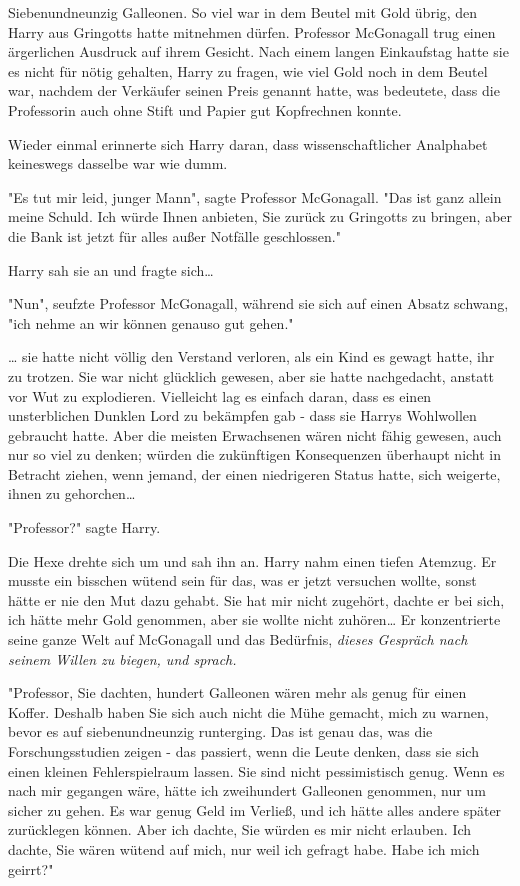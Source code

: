 {Siebenundneunzig Galleonen. So viel war in dem Beutel mit Gold übrig, den Harry aus Gringotts hatte mitnehmen dürfen. Professor McGonagall trug einen ärgerlichen Ausdruck auf ihrem Gesicht. Nach einem langen Einkaufstag hatte sie es nicht für nötig gehalten, Harry zu fragen, wie viel Gold noch in dem Beutel war, nachdem der Verkäufer seinen Preis genannt hatte, was bedeutete, dass die Professorin auch ohne Stift und Papier gut Kopfrechnen konnte.

Wieder einmal erinnerte sich Harry daran, dass wissenschaftlicher Analphabet keineswegs dasselbe war wie dumm.

"Es tut mir leid, junger Mann", sagte Professor McGonagall. "Das ist ganz allein meine Schuld. Ich würde Ihnen anbieten, Sie zurück zu Gringotts zu bringen, aber die Bank ist jetzt für alles außer Notfälle geschlossen."

Harry sah sie an und fragte sich…

"Nun", seufzte Professor McGonagall, während sie sich auf einen Absatz schwang, "ich nehme an wir können genauso gut gehen."

… sie hatte nicht völlig den Verstand verloren, als ein Kind es gewagt hatte, ihr zu trotzen. Sie war nicht glücklich gewesen, aber sie hatte nachgedacht, anstatt vor Wut zu explodieren. Vielleicht lag es einfach daran, dass es einen unsterblichen Dunklen Lord zu bekämpfen gab - dass sie Harrys Wohlwollen gebraucht hatte. Aber die meisten Erwachsenen wären nicht fähig gewesen, auch nur so viel zu denken; würden die zukünftigen Konsequenzen überhaupt nicht in Betracht ziehen, wenn jemand, der einen niedrigeren Status hatte, sich weigerte, ihnen zu gehorchen…

"Professor?" sagte Harry.

Die Hexe drehte sich um und sah ihn an. Harry nahm einen tiefen Atemzug. Er musste ein bisschen wütend sein für das, was er jetzt versuchen wollte, sonst hätte er nie den Mut dazu gehabt. Sie hat mir nicht zugehört, dachte er bei sich, ich hätte mehr Gold genommen, aber sie wollte nicht zuhören… Er konzentrierte seine ganze Welt auf McGonagall und das Bedürfnis, \emph{dieses Gespräch nach seinem Willen zu biegen, und sprach.}

"Professor, Sie dachten, hundert Galleonen wären mehr als genug für einen Koffer. Deshalb haben Sie sich auch nicht die Mühe gemacht, mich zu warnen, bevor es auf siebenundneunzig runterging. Das ist genau das, was die Forschungsstudien zeigen - das passiert, wenn die Leute denken, dass sie sich einen kleinen Fehlerspielraum lassen. Sie sind nicht pessimistisch genug. Wenn es nach mir gegangen wäre, hätte ich zweihundert Galleonen genommen, nur um sicher zu gehen. Es war genug Geld im Verließ, und ich hätte alles andere später zurücklegen können. Aber ich dachte, Sie würden es mir nicht erlauben. Ich dachte, Sie wären wütend auf mich, nur weil ich gefragt habe. Habe ich mich geirrt?"

}
